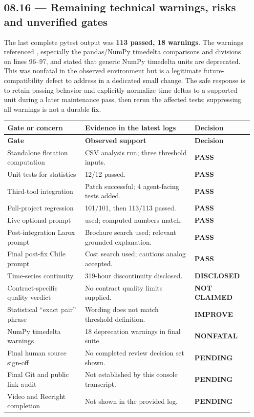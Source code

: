 \documentclass[11pt,a4paper]{article}
\DeclareRobustCommand{\code}[1]{{\ttfamily\small\detokenize{#1}}}
\begin{document}
\subsection{08.16 --- Remaining technical warnings, risks and unverified gates}
The last complete pytest output was \textbf{113 passed, 18 warnings}. The warnings referenced , especially the pandas/NumPy timedelta comparisons and divisions on lines 96--97, and stated that generic NumPy timedelta units are deprecated. This was nonfatal in the observed environment but is a legitimate future-compatibility defect to address in a dedicated small change. The safe response is to retain passing behavior and explicitly normalize time deltas to a supported unit during a later maintenance pass, then rerun the affected tests; suppressing all warnings is not a durable fix.

\begin{longtable}{@{}L{52mm}L{60mm}L{32mm}@{}}
\toprule
\textbf{Gate or concern} & \textbf{Evidence in the latest logs} & \textbf{Decision}\\\midrule\endfirsthead
\toprule\textbf{Gate} & \textbf{Observed support} & \textbf{Decision}\\\midrule\endhead
Standalone flotation computation & CSV analysis run; three threshold inputs. & \textbf{PASS}\\
Unit tests for statistics & 12/12 passed. & \textbf{PASS}\\
Third-tool integration & Patch successful; 4 agent-facing tests added. & \textbf{PASS}\\
Full-project regression & 101/101, then 113/113 passed. & \textbf{PASS}\\
Live optional prompt & \code{analyze_flotation} used; computed numbers match. & \textbf{PASS}\\
Post-integration Larox prompt & Brochure search used; relevant grounded explanation. & \textbf{PASS}\\
Final post-fix Chile prompt & Cost search used; cautious analog accepted. & \textbf{PASS}\\
Time-series continuity & 319-hour discontinuity disclosed. & \textbf{DISCLOSED}\\
Contract-specific quality verdict & No contract quality limits supplied. & \textbf{NOT CLAIMED}\\
Statistical ``exact pair'' phrase & Wording does not match threshold definition. & \textbf{IMPROVE}\\
NumPy timedelta warnings & 18 deprecation warnings in final suite. & \textbf{NONFATAL}\\
Final human source sign-off & No completed review decision set shown. & \textbf{PENDING}\\
Final Git and public link audit & Not established by this console transcript. & \textbf{PENDING}\\
Video and Recright completion & Not shown in the provided log. & \textbf{PENDING}\\\bottomrule
\end{longtable}
\end{document}
